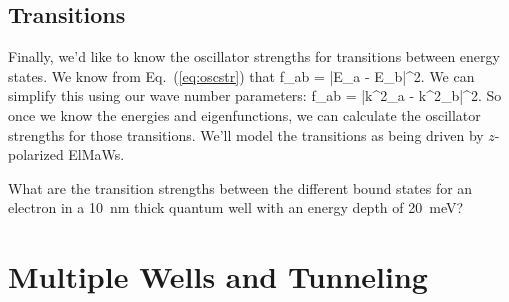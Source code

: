 \section{Transitions}
Finally, we'd like to know the oscillator strengths for transitions between energy states. We know from Eq.~(\ref{eq:oscstr}) that 
\beq
f_{ab} =  \left|E_a - E_b\right|^2.
\eeq
We can simplify this using our wave number parameters:
\beq
f_{ab} =  \left|k^2_a - k^2_b\right|^2.
\eeq
So once we know the energies and eigenfunctions, we can calculate the oscillator strengths for those transitions. We'll model the transitions as being driven by $z$-polarized ElMaWs.

\begin{exercise}
What are the transition strengths between the different bound states for an electron in a 10~nm thick quantum well with an energy depth of 20~meV?

\end{exercise}



\chapter{Multiple Wells and Tunneling}


